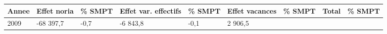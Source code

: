 \begin{longtable}[]{@{}lllllllll@{}}
\toprule
\begin{minipage}[b]{0.05\columnwidth}\raggedright
Annee\strut
\end{minipage} & \begin{minipage}[b]{0.10\columnwidth}\raggedright
Effet noria\strut
\end{minipage} & \begin{minipage}[b]{0.06\columnwidth}\raggedright
\% SMPT\strut
\end{minipage} & \begin{minipage}[b]{0.16\columnwidth}\raggedright
Effet var. effectifs\strut
\end{minipage} & \begin{minipage}[b]{0.06\columnwidth}\raggedright
\% SMPT\strut
\end{minipage} & \begin{minipage}[b]{0.12\columnwidth}\raggedright
Effet vacances\strut
\end{minipage} & \begin{minipage}[b]{0.06\columnwidth}\raggedright
\% SMPT\strut
\end{minipage} & \begin{minipage}[b]{0.09\columnwidth}\raggedright
Total\strut
\end{minipage} & \begin{minipage}[b]{0.06\columnwidth}\raggedright
\% SMPT\strut
\end{minipage}\tabularnewline
\midrule
\endhead
\begin{minipage}[t]{0.05\columnwidth}\raggedright
2009\strut
\end{minipage} & \begin{minipage}[t]{0.10\columnwidth}\raggedright
-68 397,7\strut
\end{minipage} & \begin{minipage}[t]{0.06\columnwidth}\raggedright
-0,7\strut
\end{minipage} & \begin{minipage}[t]{0.16\columnwidth}\raggedright
-6 843,8\strut
\end{minipage} & \begin{minipage}[t]{0.06\columnwidth}\raggedright
-0,1\strut
\end{minipage} & \begin{minipage}[t]{0.12\columnwidth}\raggedright
2 906,5\strut
\end{minipage} & \begin{minipage}[t]{0.06\columnwidth}\raggedright

\end{minipage}
\end{longtable}
